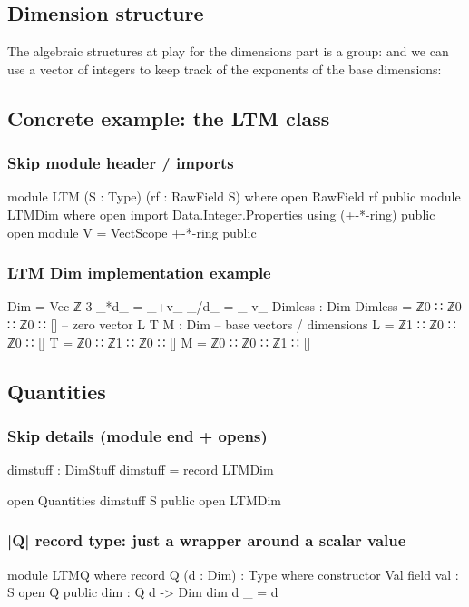 \documentclass{article}
\begin{document}
\subsection{Dimension structure}
\label{sec:orgd044122}
The algebraic structures at play for the dimensions part is a group:
and we can use a vector of integers to keep track of the exponents of
the base dimensions:

\subsection{Concrete example: the LTM class}
\label{sec:org58f9714}
\subsubsection{Skip module header / imports}
\label{sec:orgc1be1b5}
\begin{code}
module LTM (S : Type) (rf : RawField S) where
  open RawField rf public
  module LTMDim where
    open import Data.Integer.Properties using (+-*-ring) public
    open module V = VectScope +-*-ring public
\end{code}
\subsubsection{LTM Dim implementation example}
\label{sec:orgef10fd0}
\begin{code}
    Dim = Vec ℤ 3
    _*d_ = _+v_
    _/d_ = _-v_
    Dimless : Dim
    Dimless  = ℤ0 ∷ ℤ0 ∷ ℤ0 ∷ [] -- zero vector
    L T M : Dim -- base vectors / dimensions
    L        = ℤ1 ∷ ℤ0 ∷ ℤ0 ∷ []
    T        = ℤ0 ∷ ℤ1 ∷ ℤ0 ∷ []
    M        = ℤ0 ∷ ℤ0 ∷ ℤ1 ∷ []
\end{code}
\subsection{Quantities}
\label{sec:org52ece7d}
\subsubsection{Skip details (module end + opens)}
\label{sec:org22e4838}
\begin{code}
  dimstuff : DimStuff
  dimstuff = record { LTMDim }

  open Quantities dimstuff S public
  open LTMDim
\end{code}
\subsubsection{|Q| record type: just a wrapper around a scalar value}
\label{sec:org235f1bd}
\begin{code}
  module LTMQ where
    record Q (d : Dim) : Type where
      constructor Val
      field
        val : S
    open Q public
    dim : Q d -> Dim
    dim {d} _ = d
\end{code}
\end{document}
